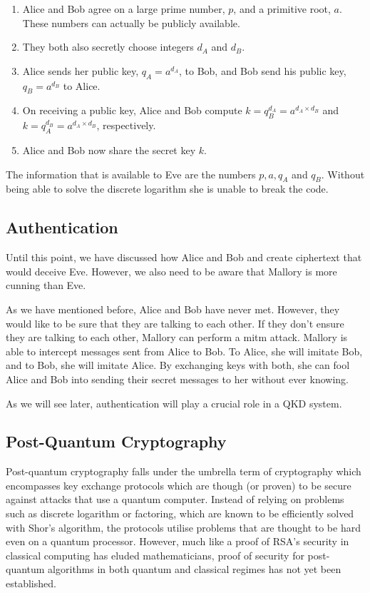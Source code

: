 \begin{enumerate}
	\item Alice and Bob agree on a large prime number, $p$, and a primitive root, $a$. These numbers can actually be publicly available.
	\item They both also secretly choose integers $d_A$ and $d_B$.
	\item Alice sends her public key, $q_A = a^{d_A}$, to Bob, and Bob send his public key, $q_B = a^{d_B}$ to Alice.
	\item On receiving a public key, Alice and Bob compute $k = q_B^{d_A} = a^{d_A\times d_B}$ and $k = q_A^{d_B} = a^{d_A\times d_B}$, respectively.
	\item Alice and Bob now share the secret key $k$.
\end{enumerate}

The information that is available to Eve are the numbers $p, a, q_{A}$ and $q_{B}$. Without being able to solve the discrete logarithm she is unable to break the code. 

\subsection{Authentication}

Until this point, we have discussed how Alice and Bob and create ciphertext that would deceive Eve. However, we also need to be aware that Mallory is more cunning than Eve. 

As we have mentioned before, Alice and Bob have never met. However, they would like to be sure that they are talking to each other. If they don't ensure they are talking to each other, Mallory can perform a \ac{mitm} attack. Mallory is able to intercept messages sent from Alice to Bob. To Alice, she will imitate Bob, and to Bob, she will imitate Alice. By exchanging keys with both, she can fool Alice and Bob into sending their secret messages to her without ever knowing.

As we will see later, authentication will play a crucial role in a \ac{QKD} system.

\subsection{Post-Quantum Cryptography}

Post-quantum cryptography falls under the umbrella term of  cryptography which encompasses key exchange protocols which are though (or proven) to be secure against attacks that use a quantum computer. Instead of relying on problems such as discrete logarithm or factoring, which are known to be efficiently solved with Shor's algorithm, the protocols utilise problems that are thought to be hard even on a quantum processor. However, much like a proof of RSA's security in classical computing has eluded mathematicians, proof of security for post-quantum algorithms in both quantum and classical regimes has not yet been established.

